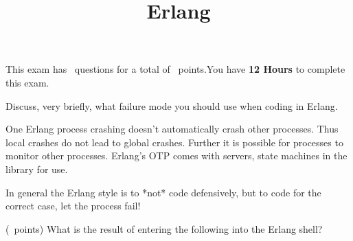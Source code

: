 

\usepackage{color}
\lstset{numbers=left}


\printanswers

\title{Erlang}
\maketitle



\begin{center}
    This exam has \numquestions\ questions for a total of \numpoints\
    points.You have {\bf 12 Hours} to complete this exam.
\end{center}


\begin{questions}

    \question[5] Discuss, very briefly, what failure mode you should
    use when coding in Erlang.

    \begin{solution}
        One Erlang process crashing doesn't automatically crash other
        processes.  Thus local crashes do not lead to global
        crashes. Further it is possible for processes to monitor other
        processes.  Erlang's OTP comes with servers, state machines in
        the library for use.
    
        In general the Erlang style is to *not* code defensively, but
        to code for the correct case, let the process fail!
    \end{solution}

    \question (\totalpoints\ points) What is the result of entering
    the following into the Erlang shell?

\end{questions}
